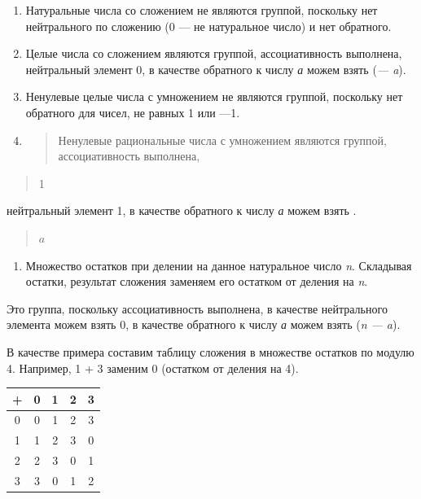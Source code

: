 \documentclass[12pt]{article}
\begin{document}
    \begin{enumerate}
        \item
              Натуральные числа со сложением не являются группой, поскольку нет
              нейтрального по сложению (0 --- не натуральное число) и нет обратного.
        \item
              Целые числа со сложением являются группой, ассоциативность выполнена,
              нейтральный элемент 0, в качестве обратного к числу \emph{а} можем
              взять (\emph{--- a}).
        \item
              Ненулевые целые числа с умножением не являются группой, поскольку нет
              обратного для чисел, не равных 1 или ---1.
        \item
              \begin{quote}
                  Ненулевые рациональные числа с умножением являются группой,
                  ассоциативность выполнена,
              \end{quote}
    \end{enumerate}

    \begin{quote}
        1
    \end{quote}

    нейтральный элемент 1, в качестве обратного к числу \emph{а} можем взять
    .

    \begin{quote}
        $a$
    \end{quote}

    \begin{enumerate}
        \def\labelenumi{\arabic{enumi}.}
        \item
              Множество остатков при делении на данное натуральное число \emph{n}.
              Складывая остатки, результат сложения заменяем его остатком от деления
              на \emph{n}.
    \end{enumerate}

    Это группа, поскольку ассоциативность выполнена, в качестве нейтрального
    элемента можем взять 0, в качестве обратного к числу \emph{а} можем
    взять (\emph{n --- a}).

    В качестве примера составим таблицу сложения в множестве остатков по
    модулю 4. Например, 1 + 3 заменим 0 (остатком от деления на 4).

    \begin{tabular}{|c|c|c|c|c|}
        \hline
        + & 0 & 1 & 2 & 3 \\
        \hline
        0 & 0 & 1 & 2 & 3 \\
        \hline
        1 & 1 & 2 & 3 & 0 \\
        \hline
        2 & 2 & 3 & 0 & 1 \\
        \hline
        3 & 3 & 0 & 1 & 2 \\
        \hline
    \end{tabular}
\end{document}
